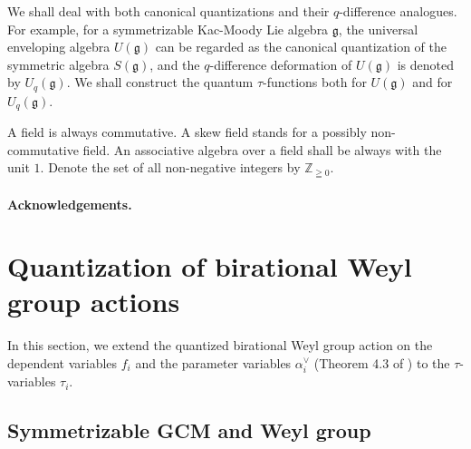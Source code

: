 \documentclass[12pt,twoside]{article}
\newcommand\av{\alpha^\vee}
\newcommand\g{{\mathfrak g}}
\newcommand\Z{{\mathbb Z}} %
\theoremstyle{plain} %
\theoremstyle{definition} %
\theoremstyle{definition} %
\numberwithin{theorem}{section}
\numberwithin{equation}{section}
\numberwithin{figure}{section}
\numberwithin{table}{section}
\begin{document}
We shall deal with both canonical quantizations and their $q$-difference analogues. 
For example, for a symmetrizable Kac-Moody Lie algebra $\g$, 
the universal enveloping algebra $U(\g)$ can be regarded as 
the canonical quantization of the symmetric algebra $S(\g)$,
and the $q$-difference deformation of $U(\g)$ is denoted by $U_q(\g)$.
We shall construct the quantum $\tau$-functions both for $U(\g)$ and for $U_q(\g)$.

A field is always commutative.
A skew field stands for a possibly non-commutative field.
An associative algebra over a field shall be always with the unit $1$.
Denote the set of all non-negative integers by $\Z_{\geqq0}$.


\paragraph{Acknowledgements.}
\ACKNOWLEDGEMENTS


\section{Quantization of birational Weyl group actions}
\label{sec:QBWGA}

In this section, we extend 
the quantized birational Weyl group action
on the dependent variables $f_i$ and the parameter variables $\av_i$
(Theorem 4.3 of \cite{Kuroki2008}) to the $\tau$-variables $\tau_i$.


\subsection{Symmetrizable GCM and Weyl group}
\label{sec:GCM}
\end{document}
